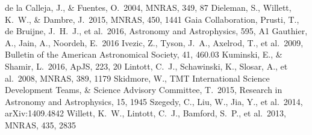 \documentclass{article}
\begin{document}
\begin{thebibliography}{9}
 de la Calleja, J., \& Fuentes, O.\ 2004, MNRAS, 349, 87 
 Dieleman, S., Willett, K.~W., \& Dambre, J.\ 2015, MNRAS, 450, 1441
 Gaia Collaboration, Prusti, T., de Bruijne, J.~H.~J., et al.\ 2016, Astronomy and Astrophysics, 595, A1  
 Gauthier, A., Jain, A., Noordeh, E.\ 2016
 Ivezic, Z., Tyson, J.~A., Axelrod, T., et al.\ 2009, Bulletin of the American Astronomical Society, 41, 460.03 
 Kuminski, E., \& Shamir, L.\ 2016, ApJS, 223, 20 
 Lintott, C.~J., Schawinski, K., Slosar, A., et al.\ 2008, MNRAS, 389, 1179
 Skidmore, W., TMT International Science Development Teams, \& Science Advisory Committee, T.\ 2015, Research in Astronomy and Astrophysics, 15, 1945 
 Szegedy, C., Liu, W., Jia, Y., et al.\ 2014, arXiv:1409.4842 
 Willett, K.~W., Lintott, C.~J., Bamford, S.~P., et al.\ 2013, MNRAS, 435, 2835  
\end{thebibliography}
\end{document}
